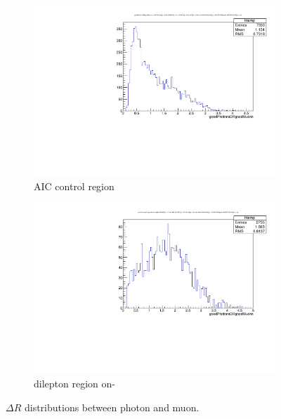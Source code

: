 \begin{figure}
\begin{center}
	\begin{subfigure}[b]{.7\textwidth}
		\includegraphics[width=\textwidth]{Background/bkg_fakeLight/goodPhotonsDRgoodMuons_AIC}
		\caption{AIC control region}
	\end{subfigure}
	\begin{subfigure}[b]{.7\textwidth}
		\includegraphics[width=\textwidth]{Background/bkg_fakeLight/goodPhotonsDRgoodMuons_ONZ}
		\caption{dilepton region on-\Z}
	\end{subfigure}
	\caption{$\Delta R$ distributions between photon and muon.
	\label{fig:fakeLight_AIC_DR}}
\end{center}
\end{figure}

